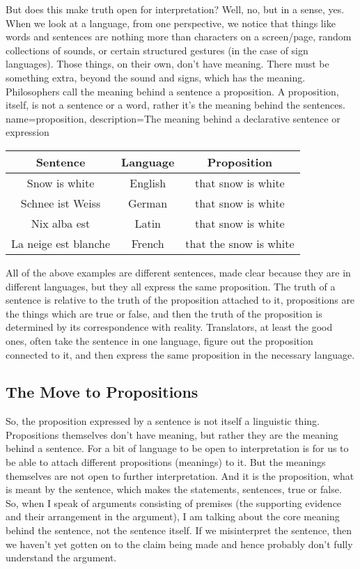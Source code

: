 But does this make truth open for interpretation? Well, no, but in a sense, yes. When we look at a language, from one perspective, we notice that things like words and sentences are nothing more than characters on a screen/page, random collections of sounds, or certain structured gestures (in the case of sign languages). Those things, on their own, don't have meaning. There must be something extra, beyond the sound and signs, which has the meaning.  Philosophers call the meaning behind a sentence a \gls{proposition}. A proposition, itself, is not a sentence or a word, rather it's the meaning behind the sentences.\\

{
name=proposition,
description={The meaning behind a declarative sentence or expression}
}

\begin{center}
\begin{tabular}{c|c|c}\hline
Sentence&Language&Proposition\\\hline
Snow is white&English&that snow is white\\
Schnee ist Weiss&German&that snow is white\\
Nix alba est&Latin&that snow is white\\
La neige est blanche&French&that the snow is white\\
\hline
\end{tabular}
\end{center}
All of the above examples are different sentences, made clear because they are in different languages, but they all express the same proposition. The truth of a sentence is relative to the truth of the proposition attached to it, propositions are the things which are true or false, and then the truth of the proposition is determined by its correspondence with reality. Translators, at least the good ones, often take the sentence in one language, figure out the proposition connected to it, and then express the same proposition in the necessary language.

\subsection{The Move to Propositions}
So, the proposition expressed by a sentence is not itself a linguistic thing. Propositions themselves don't have meaning, but rather they are the meaning behind a sentence. For a bit of language to be open to interpretation is for us to be able to attach different propositions (meanings) to it. But the meanings themselves are not open to further interpretation. And it is the proposition, what is meant by the sentence, which makes the statements, sentences, true or false. So, when I speak of arguments consisting of premises (the supporting evidence and their arrangement in the argument), I am talking about the core meaning behind the sentence, not the sentence itself. If we misinterpret the sentence, then we haven’t yet gotten on to the claim being made and hence probably don’t fully understand the argument.

